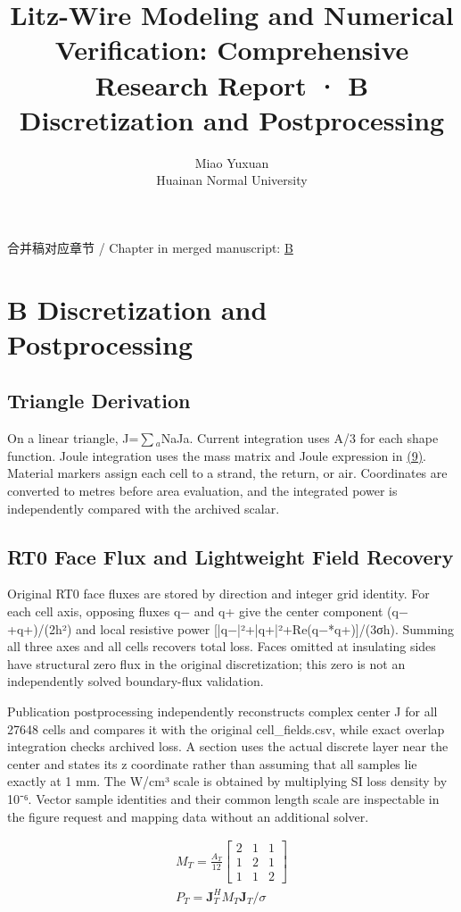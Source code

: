 \documentclass[11pt]{article}
\begin{document}
\title{Litz-Wire Modeling and Numerical Verification: Comprehensive Research Report · B Discretization and Postprocessing}
\author{Miao Yuxuan\\Huainan Normal University}
\date{}
\maketitle
\noindent 合并稿对应章节 / Chapter in merged manuscript: \href{report_en_single.pdf#chapter-B}{B}\par
\FloatBarrier
\section*{B Discretization and Postprocessing}
\hypertarget{chapter-B}{}
\subsection*{Triangle Derivation}
\hypertarget{B.triangle_derivation.heading}{}
On a linear triangle, J=\(\sum\)\(_a\)NaJa. Current integration uses A/3 for each shape function. Joule integration uses the mass matrix and Joule expression in \href{report_en_single.pdf#E09}{(9)}. Material markers assign each cell to a strand, the return, or air. Coordinates are converted to metres before area evaluation, and the integrated power is independently compared with the archived scalar.


\subsection*{RT0 Face Flux and Lightweight Field Recovery}
\hypertarget{B.report_rt0.heading}{}
Original RT0 face fluxes are stored by direction and integer grid identity. For each cell axis, opposing fluxes q− and q+ give the center component (q−+q+)/(2h²) and local resistive power [|q−|²+|q+|²+Re(q−*q+)]/(3σh). Summing all three axes and all cells recovers total loss. Faces omitted at insulating sides have structural zero flux in the original discretization; this zero is not an independently solved boundary-flux validation.


Publication postprocessing independently reconstructs complex center J for all 27648 cells and compares it with the original cell\_fields.csv, while exact overlap integration checks archived loss. A section uses the actual discrete layer near the center and states its z coordinate rather than assuming that all samples lie exactly at 1 mm. The W/cm³ scale is obtained by multiplying SI loss density by 10⁻⁶. Vector sample identities and their common length scale are inspectable in the figure request and mapping data without an additional solver.


\hypertarget{E09}{}
\begin{equation}
\begin{gathered}
M_T=\frac{A_T}{12}\begin{bmatrix}2&1&1\\1&2&1\\1&1&2\end{bmatrix} \\
P_T=\mathbf J_T^H M_T\mathbf J_T/\sigma
\end{gathered}
\tag{9}\label{eq:E09}
\end{equation}
\end{document}
